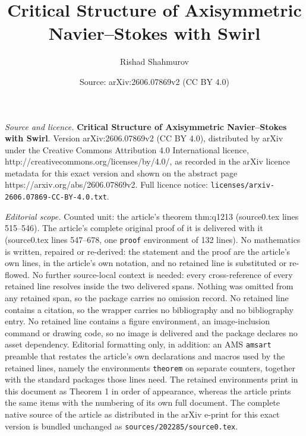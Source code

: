 \documentclass[10pt,a4paper]{amsart}
\title{\textbf{Critical Structure of Axisymmetric Navier--Stokes with Swirl}}
\author{Rishad Shahmurov}
\date{Source: arXiv:2606.07869v2 (CC BY 4.0)}
\begin{document}
\maketitle

\noindent\emph{Source and licence.} \textbf{Critical Structure of Axisymmetric Navier--Stokes with Swirl}. Version arXiv:2606.07869v2 (CC BY 4.0), distributed by arXiv under the Creative Commons Attribution 4.0 International licence, http://creativecommons.org/licenses/by/4.0/, as recorded in the arXiv licence metadata for this exact version and shown on the abstract page https://arxiv.org/abs/2606.07869v2. Full licence notice: \texttt{licenses/arxiv-2606.07869-CC-BY-4.0.txt}.\par\smallskip

\noindent\textit{Editorial scope.} Counted unit: the article's theorem thm:q1213 (source0.tex lines 515--546). The article's complete original proof of it is delivered with it (source0.tex lines 547--678, one \texttt{proof} environment of 132 lines). No mathematics is written, repaired or re-derived: the statement and the proof are the article's own lines, in the article's own notation, and no retained line is substituted or re-flowed.  No further source-local context is needed: every cross-reference of every retained line resolves inside the two delivered spans.  Nothing was omitted from any retained span, so the package carries no omission record.  No retained line contains a citation, so the wrapper carries no bibliography and no bibliography entry.  No retained line contains a figure environment, an image-inclusion command or drawing code, so no image is delivered and the package declares no asset dependency.  Editorial formatting only, in addition: an AMS \texttt{amsart} preamble that restates the article's own declarations and macros used by the retained lines, namely the environments \texttt{theorem} on separate counters, together with the standard packages those lines need.  The retained environments print in this document as Theorem 1 in order of appearance, whereas the article prints the same items with the numbering of its own full document.  The complete native source of the article as distributed in the arXiv e-print for this exact version is bundled unchanged as \texttt{sources/202285/source0.tex}.
\end{document}
